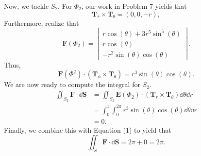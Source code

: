 \documentclass[11pt]{article}
\renewcommand{\vec}[1]{\mathbf{#1}}
\begin{document}
Now, we tackle $S_{2}$. For $\Phi_{2}$, our work in Problem 7 yields that
\[
	\mathbf{T}_{r} \times \mathbf{T}_{\theta} = (0, 0, -r),
\]
Furthermore, realize that
\[
	\mathbf{F}(\Phi_{2}) = \begin{bmatrix} r \cos(\theta) + 3 r^{5} \sin^{5}(\theta) \\ r \cos(\theta) \\ -r^{2} \sin(\theta)\cos(\theta) \end{bmatrix}.
\]
Thus,
\[
	\mathbf{F}(\Phi^{2}) \cdot (\mathbf{T}_{\phi} \times \mathbf{T}_{\theta}) = r^{3}\sin(\theta)\cos(\theta).
\]
We are now ready to compute the integral for $S_{2}$.
\begin{align*}
	\iint_{S_{2}} \mathbf{F} \cdot \dd{\vec{S}}  &= \iint_{S_{2}} \mathbf{E}(\Phi_{2}) \cdot (\mathbf{T}_{r} \times \mathbf{T}_{\theta}) \dd{\theta} \dd{r} \\
	&= \int_{0}^{1} \int_{0}^{2\pi} r^{3} \sin(\theta)\cos(\theta)  \dd{\theta} \dd{r} \\
	&= 0.
\end{align*}
Finally, we combine this with Equation (1) to yield that
\[
	\iint_{S} \mathbf{F} \cdot \dd{\vec{S}} = 2\pi + 0 = \boxed{2\pi}.
\]
\end{document}
